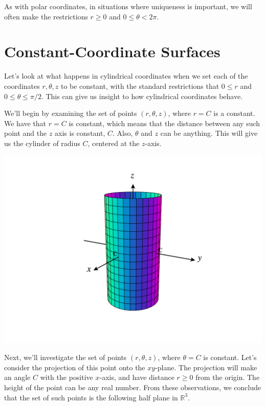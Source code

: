 \documentclass{ximera}
\begin{document}
As with polar coordinates, in situations where uniqueness is important, we will often make the restrictions $r\geq 0$ and $0\leq\theta<2\pi$. 

\section*{Constant-Coordinate Surfaces}

Let's look at what happens in cylindrical coordinates when we set each of the coordinates $r,\theta,z$ to be constant, with the standard restrictions that $0\leq r$ and $0\leq \theta\leq \pi/2$. This can give us insight to how cylindrical coordinates behave.

We'll begin by examining the set of points $(r,\theta, z)$, where $r=C$ is a constant. We have that $r=C$ is constant, which means that the distance between any such point and the $z$ axis is constant, $C$. Also, $\theta$ and $z$ can be anything. This will give us the cylinder of radius $C$, centered at the $z$-axis.

\begin{image}
\includegraphics[width=\textwidth]{CalcPlot3D-r_constant}
\end{image}

Next, we'll investigate the set of points $(r,\theta,z)$, where $\theta = C$ is constant. Let's consider the projection of this point onto the $xy$-plane. The projection will make an angle $C$ with the positive $x$-axis, and have distance $r\geq 0$ from the origin. The height of the point can be any real number. From these observations, we conclude that the set of such points is the following half plane in $\mathbb{R}^3$.
\end{document}

